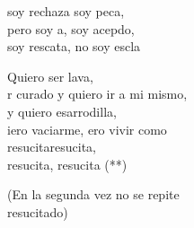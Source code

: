 \begin{cancion}[Resucitados][]
	soy rechaza soy peca, \\
	pero soy a, soy acepdo, \\
	soy rescata, no soy escla \\
	\begin{chorus}%
	Quiero  ser lava, \\
	r curado y quiero ir a mi mismo, \\
	y quiero esarrodilla, \\
	iero vaciarme, ero vivir como\\
	resucitaresucita, \\
	resucita, resucita (**) \\
	\end{chorus}%
(En la segunda vez no se repite\\
resucitado)\\
\end{cancion}%
